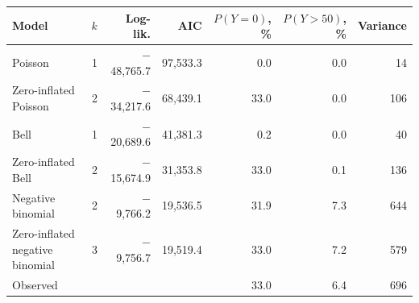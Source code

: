 \begin{tabular}{lrrrrrr}
\toprule
Model & $k$ & Log-lik. & AIC & $P(Y=0)$, \% & $P(Y>50)$, \% & Variance \\
\midrule
Poisson & 1 & $-$48,765.7 & 97,533.3 & 0.0 & 0.0 & 14 \\
Zero-inflated Poisson & 2 & $-$34,217.6 & 68,439.1 & 33.0 & 0.0 & 106 \\
Bell & 1 & $-$20,689.6 & 41,381.3 & 0.2 & 0.0 & 40 \\
Zero-inflated Bell & 2 & $-$15,674.9 & 31,353.8 & 33.0 & 0.1 & 136 \\
Negative binomial & 2 & $-$9,766.2 & 19,536.5 & 31.9 & 7.3 & 644 \\
Zero-inflated negative binomial & 3 & $-$9,756.7 & 19,519.4 & 33.0 & 7.2 & 579 \\
\addlinespace
Observed &  &  &  & 33.0 & 6.4 & 696 \\
\bottomrule
\end{tabular}
